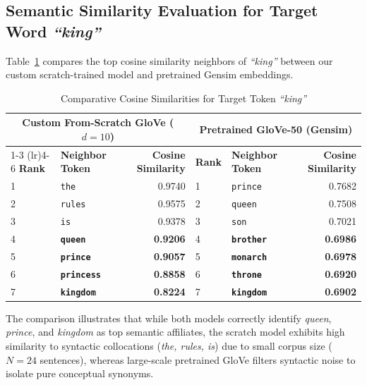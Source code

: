 \documentclass[12pt,a4paper]{report}
\begin{document}
\subsection{Semantic Similarity Evaluation for Target Word \textit{``king''}}
Table~\ref{tab:exp6_sim_compare} compares the top cosine similarity neighbors of \textit{``king''} between our custom scratch-trained model and pretrained Gensim embeddings.
\begin{table}[H]
\centering
\small
\caption{Comparative Cosine Similarities for Target Token \textit{``king''}}
\label{tab:exp6_sim_compare}
\begin{tabular}{llrllr}
\toprule
\multicolumn{3}{c}{\textbf{Custom From-Scratch GloVe ($d=10$)}} & \multicolumn{3}{c}{\textbf{Pretrained GloVe-50 (Gensim)}} \\
\cmidrule(lr){1-3} \cmidrule(lr){4-6}
\textbf{Rank} & \textbf{Neighbor Token} & \textbf{Cosine Similarity} & \textbf{Rank} & \textbf{Neighbor Token} & \textbf{Cosine Similarity} \\
\midrule
1 & \texttt{the} & 0.9740 & 1 & \texttt{prince} & 0.7682 \\
2 & \texttt{rules} & 0.9575 & 2 & \texttt{queen} & 0.7508 \\
3 & \texttt{is} & 0.9378 & 3 & \texttt{son} & 0.7021 \\
4 & \textbf{\texttt{queen}} & \textbf{0.9206} & 4 & \textbf{\texttt{brother}} & \textbf{0.6986} \\
5 & \textbf{\texttt{prince}} & \textbf{0.9057} & 5 & \textbf{\texttt{monarch}} & \textbf{0.6978} \\
6 & \textbf{\texttt{princess}} & \textbf{0.8858} & 6 & \textbf{\texttt{throne}} & \textbf{0.6920} \\
7 & \textbf{\texttt{kingdom}} & \textbf{0.8224} & 7 & \textbf{\texttt{kingdom}} & \textbf{0.6902} \\
\bottomrule
\end{tabular}
\end{table}

The comparison illustrates that while both models correctly identify \textit{queen}, \textit{prince}, and \textit{kingdom} as top semantic affiliates, the scratch model exhibits high similarity to syntactic collocations (\textit{the, rules, is}) due to small corpus size ($N=24$ sentences), whereas large-scale pretrained GloVe filters syntactic noise to isolate pure conceptual synonyms.
\end{document}
